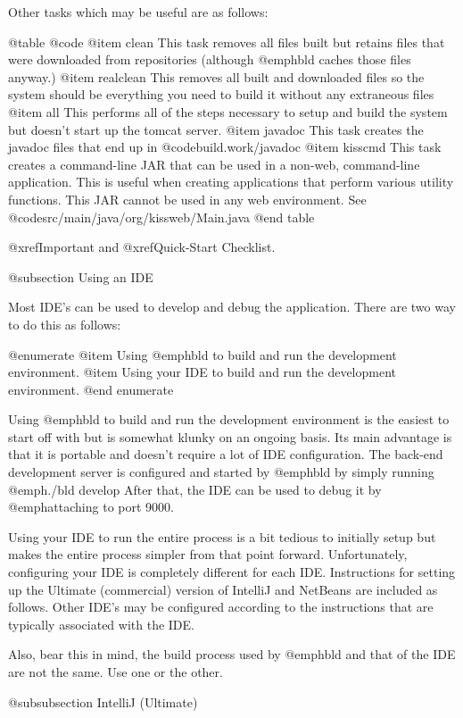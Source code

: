 Other tasks which may be useful are as follows:

@table @code
@item clean
This task removes all files built but retains files that were downloaded from
repositories (although @emph{bld} caches those files anyway.)
@item realclean
This removes all built and downloaded files so the system should be everything
you need to build it without any extraneous files
@item all
This performs all of the steps necessary to setup and build the system but
doesn't start up the tomcat server.
@item javadoc
This task creates the javadoc files that end up in @code{build.work/javadoc}
@item kisscmd
This task creates a command-line JAR that can be used in a non-web, command-line application.
This is useful when creating applications that perform various utility functions.  This
JAR cannot be used in any web environment.  See @code{src/main/java/org/kissweb/Main.java}
@end table

@xref{Important} and @xref{Quick-Start Checklist}.

@subsection Using an IDE

Most IDE's can be used to develop and debug the application.  There are two
way to do this as follows:

@enumerate
@item
Using @emph{bld} to build and run the development environment.
@item
Using your IDE to build and run the development environment.
@end enumerate

Using @emph{bld} to build and run the development environment is the
easiest to start off with but is somewhat klunky on an ongoing basis.
Its main advantage is that it is portable and doesn't require a lot of
IDE configuration.  The back-end development server is configured and
started by @emph{bld} by simply running @emph{./bld develop} After
that, the IDE can be used to debug it by @emph{attaching} to port
9000.

Using your IDE to run the entire process is a bit tedious to initially
setup but makes the entire process simpler from that point forward.
Unfortunately, configuring your IDE is completely different for each
IDE.  Instructions for setting up the Ultimate (commercial) version of
IntelliJ and NetBeans are included as follows.  Other IDE's may be
configured according to the instructions that are typically associated
with the IDE.

Also, bear this in mind, the build process used by @emph{bld} and that
of the IDE are not the same.  Use one or the other.


@subsubsection IntelliJ (Ultimate)

